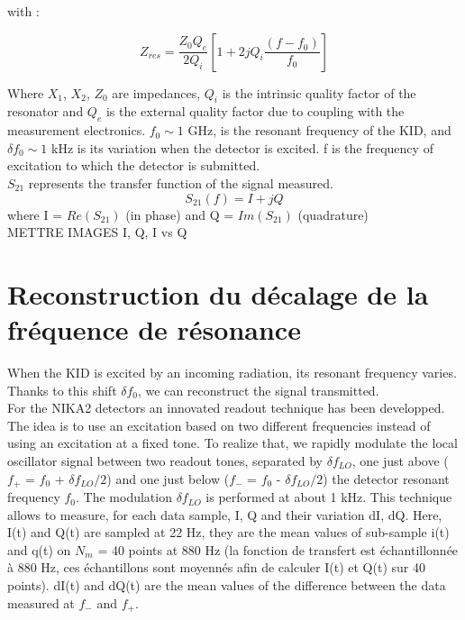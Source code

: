 \documentclass[english,11pt]{report}
\begin{document}
with :

\begin{equation}
Z_{res} = \frac{Z_{0}Q_{e}}{2Q_{i}}[1 + 2jQ_{i}\frac{(f-f_{0})}{f_{0}}]
\end{equation}

Where $X_{1}$, $X_{2}$, $Z_{0}$ are impedances, $Q_{i}$ is the intrinsic quality factor of the resonator and $Q_{e}$ is the external quality factor due to coupling with the measurement electronics. $f_{0} \sim 1$ GHz, is the resonant frequency of the KID, and $\delta f_{0} \sim 1$ kHz is its variation when the detector is excited. f is the frequency of excitation to which the detector is submitted.\\

$S_{21}$ represents the transfer function of the signal measured.
\begin{equation}
S_{21}(f) = I + jQ
\end{equation}
where I = $Re(S_{21})$ (in phase) and Q = $Im(S_{21})$ (quadrature)\\

METTRE IMAGES I, Q, I vs Q
	\section{Reconstruction du décalage de la fréquence de résonance}
	
When the KID is excited by an incoming radiation, its resonant frequency varies. Thanks to this shift $\delta f_{0}$, we can reconstruct the signal transmitted.\\
For the NIKA2 detectors an innovated readout technique has been developped. The idea is to use an excitation based on two different frequencies instead of using an excitation at a fixed tone. To realize that, we rapidly modulate the local oscillator signal between two readout tones, separated by $\delta f_{LO}$, one just above ($f_{+}$ = $f_{0}$ + $\delta f_{LO}/2$) and one just below ($f_{-}$ = $f_{0}$ - $\delta f_{LO}/2$) the detector resonant frequency $f_{0}$. The modulation $\delta f_{LO}$ is performed at about 1 kHz. This technique allows to measure, for each data sample, I, Q and their variation dI, dQ. Here, I(t) and Q(t) are sampled at 22 Hz, they are the mean values of sub-sample i(t) and q(t) on $N_{m}$ = 40 points at 880 Hz (la fonction de transfert est échantillonnée à 880 Hz, ces échantillons sont moyennés afin de calculer I(t) et Q(t) sur 40 points). dI(t) and dQ(t) are the mean values of the difference between the data measured at $f_{-}$ and $f_{+}$. 
\end{document}
